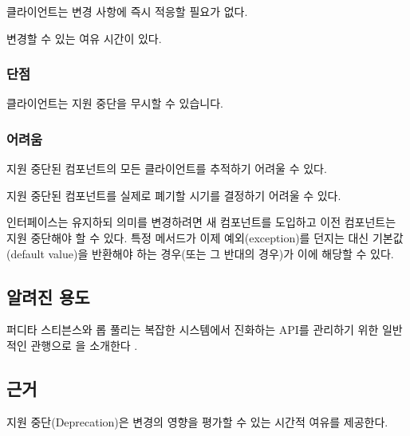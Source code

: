 \documentclass[a4paper,10pt,twoside]{book}
\begin{document}
\begin{bulletlist}
\item 클라이언트는 변경 사항에 즉시 적응할 필요가 없다.

\item 변경할 수 있는 여유 시간이 있다.
\end{bulletlist}

\subsubsection*{단점}

\begin{bulletlist}
\item 클라이언트는 지원 중단을 무시할 수 있습니다.
\end{bulletlist}

\subsubsection*{어려움}

\begin{bulletlist}
\item 지원 중단된 컴포넌트의 모든 클라이언트를 추적하기 어려울 수 있다.

\item 지원 중단된 컴포넌트를 실제로 폐기할 시기를 결정하기 어려울 수 있다.

\item 인터페이스는 유지하되 의미를 변경하려면 새 컴포넌트를 도입하고 이전 컴포넌트는 지원 중단해야 할 수 있다. 특정 메서드가 이제 예외(exception)를 던지는 대신 기본값(default value)을 반환해야 하는 경우(또는 그 반대의 경우)가 이에 해당할 수 있다.
\end{bulletlist}

\subsection*{알려진 용도}

퍼디타 스티븐스와 롭 풀리는 복잡한 시스템에서 진화하는 API를 관리하기 위한 일반적인 관행으로 을 소개한다 \cite{Stev98a}.

\subsection*{근거}

지원 중단(Deprecation)은 변경의 영향을 평가할 수 있는 시간적 여유를 제공한다.
\end{document}
